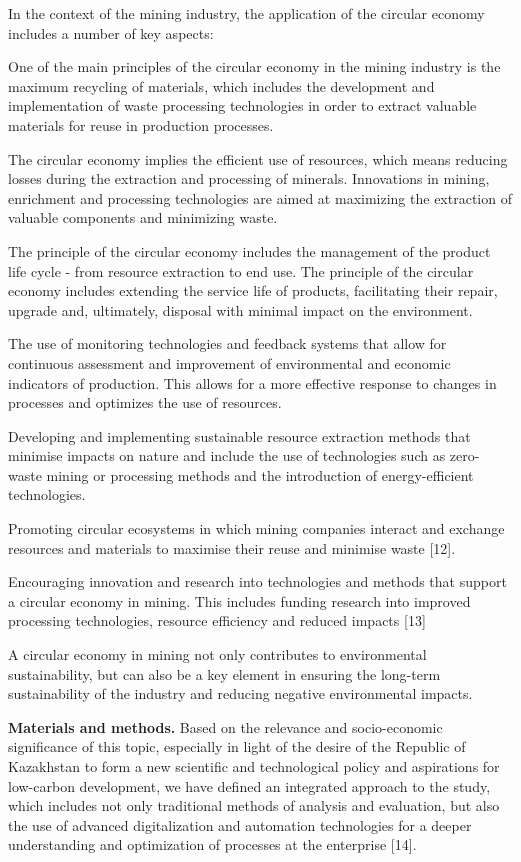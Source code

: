 \begin{multicols}{2}
In the context of the mining industry, the application of the circular
economy includes a number of key aspects:

One of the main principles of the circular economy in the mining
industry is the maximum recycling of materials, which includes the
development and implementation of waste processing technologies in order
to extract valuable materials for reuse in production processes.

The circular economy implies the efficient use of resources, which means
reducing losses during the extraction and processing of minerals.
Innovations in mining, enrichment and processing technologies are aimed
at maximizing the extraction of valuable components and minimizing
waste.

The principle of the circular economy includes the management of the
product life cycle - from resource extraction to end use. The principle
of the circular economy includes extending the service life of products,
facilitating their repair, upgrade and, ultimately, disposal with
minimal impact on the environment.

The use of monitoring technologies and feedback systems that allow for
continuous assessment and improvement of environmental and economic
indicators of production. This allows for a more effective response to
changes in processes and optimizes the use of resources.

Developing and implementing sustainable resource extraction methods that
minimise impacts on nature and include the use of technologies such as
zero-waste mining or processing methods and the introduction of
energy-efficient technologies.

Promoting circular ecosystems in which mining companies interact and
exchange resources and materials to maximise their reuse and minimise
waste {[}12{]}.

Encouraging innovation and research into technologies and methods that
support a circular economy in mining. This includes funding research
into improved processing technologies, resource efficiency and reduced
impacts {[}13{]}

A circular economy in mining not only contributes to environmental
sustainability, but can also be a key element in ensuring the long-term
sustainability of the industry and reducing negative environmental
impacts.

{\bfseries Materials and methods.} Based on the relevance and
socio-economic significance of this topic, especially in light of the
desire of the Republic of Kazakhstan to form a new scientific and
technological policy and aspirations for low-carbon development, we have
defined an integrated approach to the study, which includes not only
traditional methods of analysis and evaluation, but also the use of
advanced digitalization and automation technologies for a deeper
understanding and optimization of processes at the enterprise {[}14{]}.


\end{multicols}
